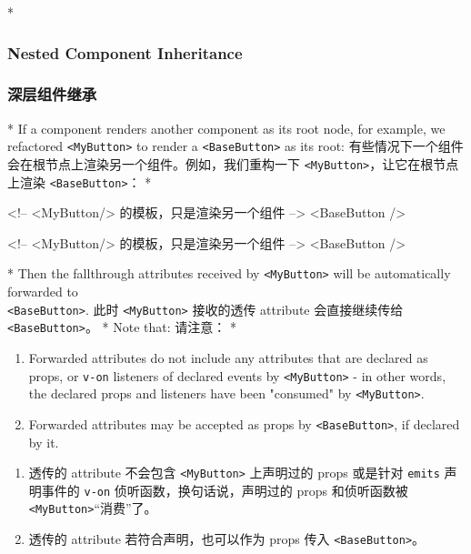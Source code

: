 \begin{paracol}{2}
\switchcolumn[0]*%
\subsubsection{Nested Component Inheritance}
\switchcolumn
\subsubsection{深层组件继承}
\switchcolumn[0]*%
If a component renders another component as its root node, for example,
we refactored \texttt{\textless{}MyButton\textgreater{}} to render a
\texttt{\textless{}BaseButton\textgreater{}} as its root:
\switchcolumn
有些情况下一个组件会在根节点上渲染另一个组件。例如，我们重构一下
\texttt{\textless{}MyButton\textgreater{}}，让它在根节点上渲染
\texttt{\textless{}BaseButton\textgreater{}}：
\switchcolumn[0]*%
\begin{codeHtml}
<!-- <MyButton/> 的模板，只是渲染另一个组件 -->
<BaseButton />
\end{codeHtml}
\switchcolumn
\begin{codeHtml}
<!-- <MyButton/> 的模板，只是渲染另一个组件 -->
<BaseButton />
\end{codeHtml}
\switchcolumn[0]*%
Then the fallthrough attributes received by
\texttt{\textless{}MyButton\textgreater{}} will be automatically
forwarded to \\\texttt{\textless{}BaseButton\textgreater{}}.
\switchcolumn
此时 \texttt{\textless{}MyButton\textgreater{}} 接收的透传 attribute
会直接继续传给 \texttt{\textless{}BaseButton\textgreater{}}。
\switchcolumn[0]*%
Note that:
\switchcolumn
请注意：
\switchcolumn[0]*%
\begin{enumerate}
\def\labelenumi{\arabic{enumi}.}
\item
  Forwarded attributes do not include any attributes that are declared
  as props, or \texttt{v-on} listeners of declared events by
  \texttt{\textless{}MyButton\textgreater{}} - in other words, the
  declared props and listeners have been "consumed" by
  \texttt{\textless{}MyButton\textgreater{}}.
\item
  Forwarded attributes may be accepted as props by
  \texttt{\textless{}BaseButton\textgreater{}}, if declared by it.
\end{enumerate}
\switchcolumn
\begin{enumerate}
\def\labelenumi{\arabic{enumi}.}
\item
  透传的 attribute 不会包含 \texttt{\textless{}MyButton\textgreater{}}
  上声明过的 props 或是针对 \texttt{emits} 声明事件的 \texttt{v-on}
  侦听函数，换句话说，声明过的 props 和侦听函数被
  \texttt{\textless{}MyButton\textgreater{}}``消费''了。
\item
  透传的 attribute 若符合声明，也可以作为 props 传入
  \texttt{\textless{}BaseButton\textgreater{}}。
\end{enumerate}
\end{paracol}

